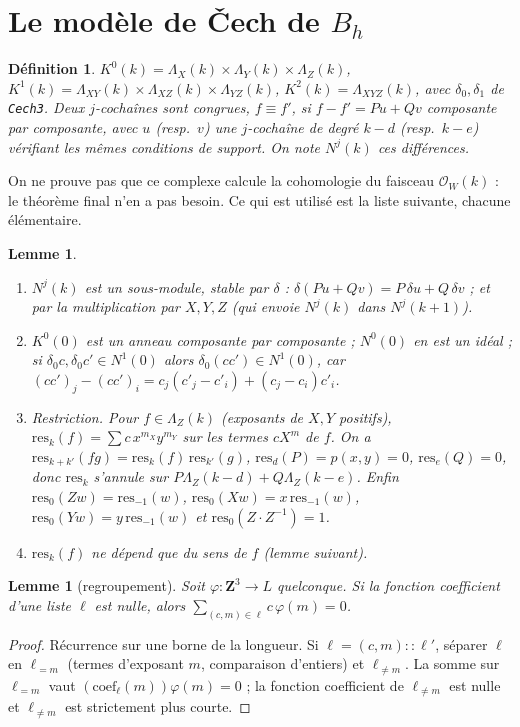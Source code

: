 \documentclass[11pt]{amsart}
\newtheorem{lemma}[proposition]{Lemme}
\newtheorem{definition}[proposition]{Définition}
\theoremstyle{remark}
\newcommand{\La}{\Lambda}
\begin{document}
\section{Le modèle de Čech de $B_h$}\label{sec:modele}

\begin{definition}
$K^0(k)=\La_X(k)\times\La_Y(k)\times\La_Z(k)$,
$K^1(k)=\La_{XY}(k)\times\La_{XZ}(k)\times\La_{YZ}(k)$,
$K^2(k)=\La_{XYZ}(k)$, avec $\delta_0,\delta_1$ de \texttt{Cech3}.
Deux $j$-cochaînes sont \emph{congrues}, $f\equiv f'$, si
$f-f'=Pu+Qv$ composante par composante, avec $u$ (resp.\ $v$) une
$j$-cochaîne de degré $k-d$ (resp.\ $k-e$) vérifiant les mêmes
conditions de support. On note $N^j(k)$ ces différences.
\end{definition}

On ne prouve pas que ce complexe calcule la cohomologie du faisceau
$\mathcal O_W(k)$ : le théorème final n'en a pas besoin. Ce qui est
utilisé est la liste suivante, chacune élémentaire.

\begin{lemma}\label{lem:modele}
\begin{enumerate}
\item $N^j(k)$ est un sous-module, stable par $\delta$ :
  $\delta(Pu+Qv)=P\,\delta u+Q\,\delta v$ ; et par la multiplication
  par $X,Y,Z$ (qui envoie $N^j(k)$ dans $N^j(k+1)$).
\item $K^0(0)$ est un anneau composante par composante ; $N^0(0)$ en est
  un idéal ; si $\delta_0c,\delta_0c'\in N^1(0)$ alors
  $\delta_0(cc')\in N^1(0)$, car
  $(cc')_j-(cc')_i=c_j(c'_j-c'_i)+(c_j-c_i)c'_i$.
\item Restriction. Pour $f\in\La_Z(k)$ (exposants de $X,Y$ positifs),
  $\mathrm{res}_k(f)=\sum c\,x^{m_X}y^{m_Y}$ sur les termes $cX^m$ de $f$.
  On a $\mathrm{res}_{k+k'}(fg)=\mathrm{res}_k(f)\,\mathrm{res}_{k'}(g)$,
  $\mathrm{res}_d(P)=p(x,y)=0$, $\mathrm{res}_e(Q)=0$, donc
  $\mathrm{res}_k$ s'annule sur $P\La_Z(k-d)+Q\La_Z(k-e)$.
  Enfin $\mathrm{res}_0(Zw)=\mathrm{res}_{-1}(w)$,
  $\mathrm{res}_0(Xw)=x\,\mathrm{res}_{-1}(w)$,
  $\mathrm{res}_0(Yw)=y\,\mathrm{res}_{-1}(w)$ et
  $\mathrm{res}_0(Z\cdot Z^{-1})=1$.
\item $\mathrm{res}_k(f)$ ne dépend que du sens de $f$ (lemme suivant).
\end{enumerate}
\end{lemma}

\begin{lemma}[regroupement]\label{lem:regroupement}
Soit $\varphi:\mathbf Z^3\to L$ quelconque. Si la fonction coefficient
d'une liste $\ell$ est nulle, alors $\sum_{(c,m)\in\ell}c\,\varphi(m)=0$.
\end{lemma}
\begin{proof}
Récurrence sur une borne de la longueur. Si $\ell=(c,m)::\ell'$,
séparer $\ell$ en $\ell_{=m}$ (termes d'exposant $m$, comparaison
d'entiers) et $\ell_{\ne m}$. La somme sur $\ell_{=m}$ vaut
$(\text{coef}_\ell(m))\varphi(m)=0$ ; la fonction coefficient de
$\ell_{\ne m}$ est nulle et $\ell_{\ne m}$ est strictement plus courte.
\end{proof}
\end{document}
